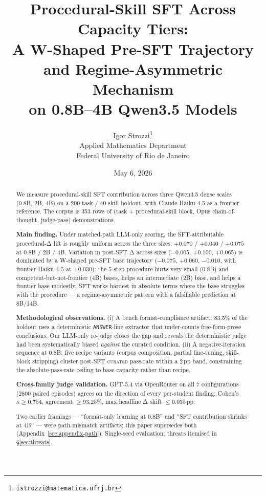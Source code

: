 \documentclass[10pt]{article}
\title{\Large\bfseries Procedural-Skill SFT Across Capacity Tiers:\\
  A W-Shaped Pre-SFT Trajectory and Regime-Asymmetric Mechanism\\
  on 0.8B--4B Qwen3.5 Models}
\author{Igor Strozzi\thanks{\texttt{istrozzi@matematica.ufrj.br}}\\
  Applied Mathematics Department\\
  Federal University of Rio de Janeiro}
\date{May 6, 2026}
\newcommand{\CU}{\textsc{curated}\xspace}
\begin{document}
\maketitle

\begin{abstract}
We measure procedural-skill SFT contribution across three Qwen3.5 dense scales (0.8B, 2B, 4B) on a 200-task / 40-skill holdout, with Claude Haiku 4.5 as a frontier reference. The corpus is 353 rows of (task + procedural-skill block, Opus chain-of-thought, judge-pass) demonstrations.

\textbf{Main finding.} Under matched-path LLM-only scoring, the SFT-attributable procedural-Δ lift is roughly uniform across the three sizes: $+0.070$ / $+0.040$ / $+0.075$ at 0.8B / 2B / 4B. Variation in post-SFT Δ across sizes ($-0.005$, $+0.100$, $+0.065$) is dominated by a W-shaped pre-SFT base trajectory ($-0.075$, $+0.060$, $-0.010$, with frontier Haiku-4-5 at $+0.030$): the 5-step procedure hurts very small (0.8B) and competent-but-not-frontier (4B) bases, helps an intermediate (2B) base, and helps a frontier base modestly. SFT works hardest in absolute terms where the base struggles with the procedure --- a regime-asymmetric pattern with a falsifiable prediction at 8B/14B.

\textbf{Methodological observations.} (i) A bench format-compliance artifact: 83.5\% of the holdout uses a deterministic \texttt{ANSWER}-line extractor that under-counts free-form-prose conclusions. Our LLM-only re-judge closes the gap and reveals the deterministic judge had been systematically biased \emph{against} the curated condition. (ii) A negative-iteration sequence at 0.8B: five recipe variants (corpus composition, partial fine-tuning, skill-block stripping) cluster post-SFT \CU{} pass-rate within a 2\,pp band, constraining the absolute-pass-rate ceiling to base capacity rather than recipe.

\textbf{Cross-family judge validation.} GPT-5.4 via OpenRouter on all 7 configurations (2800 paired episodes) agrees on the direction of every per-student finding: Cohen's $\kappa \geq 0.754$, agreement $\geq 93.25\%$, max headline Δ shift $\leq 0.035$\,pp.

Two earlier framings --- ``format-only learning at 0.8B'' and ``SFT contribution shrinks at 4B'' --- were path-mismatch artifacts; this paper supersedes both (Appendix~\ref{sec:appendix-path}). Single-seed evaluation; threats itemised in \S\ref{sec:threats}.
\end{abstract}
\end{document}
